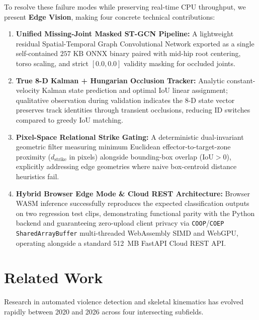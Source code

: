 \documentclass[conference]{IEEEtran}
\begin{document}
To resolve these failure modes while preserving real-time CPU throughput, we present \textbf{Edge Vision}, making four concrete technical contributions:
\begin{enumerate}
    \item \textbf{Unified Missing-Joint Masked ST-GCN Pipeline:} A lightweight residual Spatial-Temporal Graph Convolutional Network exported as a single self-contained $257\text{ KB}$ ONNX binary paired with mid-hip root centering, torso scaling, and strict $[0.0, 0.0]$ validity masking for occluded joints.
    \item \textbf{True 8-D Kalman + Hungarian Occlusion Tracker:} Analytic constant-velocity Kalman state prediction and optimal IoU linear assignment; qualitative observation during validation indicates the 8-D state vector preserves track identities through transient occlusions, reducing ID switches compared to greedy IoU matching.
    \item \textbf{Pixel-Space Relational Strike Gating:} A deterministic dual-invariant geometric filter measuring minimum Euclidean effector-to-target-zone proximity ($d_{\text{strike}}$ in pixels) alongside bounding-box overlap ($\text{IoU} > 0$), explicitly addressing edge geometries where naive box-centroid distance heuristics fail.
    \item \textbf{Hybrid Browser Edge Mode \& Cloud REST Architecture:} Browser WASM inference successfully reproduces the expected classification outputs on two regression test clips, demonstrating functional parity with the Python backend and guaranteeing zero-upload client privacy via \texttt{COOP}/\texttt{COEP} \texttt{SharedArrayBuffer} multi-threaded WebAssembly SIMD and WebGPU, operating alongside a standard 512~MB FastAPI Cloud REST API.
\end{enumerate}

\section{Related Work}
Research in automated violence detection and skeletal kinematics has evolved rapidly between 2020 and 2026 across four intersecting subfields.
\end{document}
